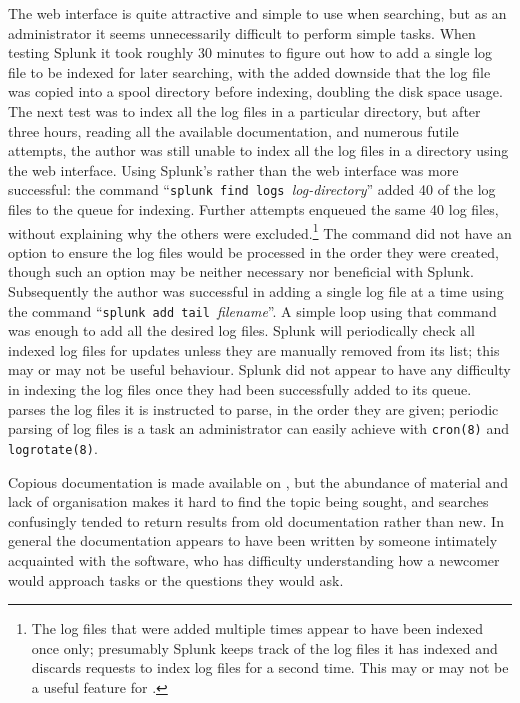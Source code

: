 The web interface is quite attractive and simple to use when searching, but
as an administrator it seems unnecessarily difficult to perform simple
tasks.  When testing Splunk it took roughly 30 minutes to figure out how to
add a single log file to be indexed for later searching, with the added
downside that the log file was copied into a spool directory before
indexing, doubling the disk space usage.  The next test was to index all
the log files in a particular directory, but after three hours, reading all
the available documentation, and numerous futile attempts, the author was
still unable to index all the log files in a directory using the web
interface.  Using Splunk's  rather than the web interface was
more successful: the command ``\texttt{splunk find logs
}\textit{log-directory\/}'' added 40 of the \numberOFlogFILES{} log files
to the queue for indexing.  Further attempts enqueued the same 40 log
files, without explaining why the others were excluded.\footnote{The log
files that were added multiple times appear to have been indexed once only;
presumably Splunk keeps track of the log files it has indexed and discards
requests to index log files for a second time.  This may or may not be a
useful feature for \parsername{}.}  The command did not have an option to
ensure the log files would be processed in the order they were created,
though such an option may be neither necessary nor beneficial with Splunk.
Subsequently the author was successful in adding a single log file at a
time using the command ``\texttt{splunk add tail }\textit{filename\/}''.  A
simple loop using that command was enough to add all the desired log files.
Splunk will periodically check all indexed log files for updates unless
they are manually removed from its list; this may or may not be useful
behaviour.  Splunk did not appear to have any difficulty in indexing the
log files once they had been successfully added to its queue.
\parsername{} parses the log files it is instructed to parse, in the order
they are given; periodic parsing of log files is a task an administrator
can easily achieve with \texttt{cron(8)} and \texttt{logrotate(8)}.

Copious documentation is made available on
, but the abundance of
material and lack of organisation makes it hard to find the topic being
sought, and searches confusingly tended to return results from old
documentation rather than new.  In general the documentation appears to
have been written by someone intimately acquainted with the software, who
has difficulty understanding how a newcomer would approach tasks or the
questions they would ask.

